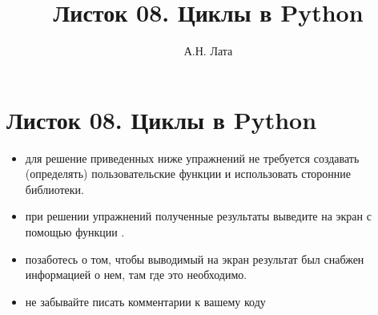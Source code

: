 \documentclass[a4,12pt]{article}
\title{Листок 08. Циклы в Python}
\author{А.Н. Лата}
\theoremstyle{remark}
\begin{document}
 


\section*{\centering Листок 08. Циклы в Python}

\begin{exercisenote}[title=Замечания]
\begin{itemize}
    \item для решение приведенных ниже упражнений не требуется создавать (определять) пользовательские функции и использовать сторонние библиотеки.
    \item при решении упражнений полученные результаты выведите на экран с помощью функции {\color{blue}{print()}}.
    \item позаботесь о том, чтобы выводимый на экран результат был снабжен информацией о нем, там где это необходимо.
    \item не забывайте писать комментарии к вашему коду
\end{itemize}
\end{exercisenote}

\end{document}
